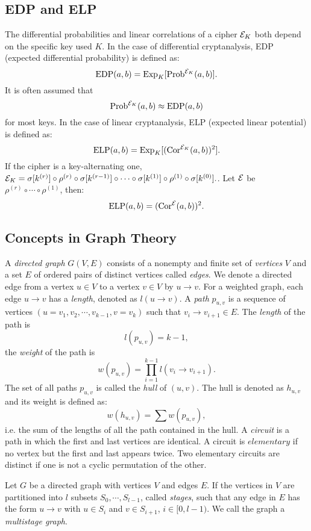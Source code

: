 \subsection{EDP and ELP}
The differential probabilities and linear correlations of a cipher $\mathcal{E}_K$ both depend on the specific key used $K$. In the case of differential cryptanalysis, EDP (expected differential probability) is defined as:
\[
    \text{EDP}(a,b)=\text{Exp}_{K}[\text{Prob}^{\mathcal{E}_K}(a,b)].
\]
It is often assumed that
\[
    \text{Prob}^{\mathcal{E}_K}(a,b)\approx\text{EDP}(a,b)
\]
for most keys. In the case of linear cryptanalysis, ELP (expected linear potential) is defined as:
\[
    \text{ELP}(a,b)=\text{Exp}_{K}[(\text{Cor}^{\mathcal{E}_K}(a,b))^2].
\]
If the cipher is a key-alternating one, $\mathcal{E}_K=\sigma[k^{(r)}]\circ\rho^{(r)}\circ\sigma[k^{(r-1)}]\circ\cdots\circ\sigma[k^{(1)}]\circ\rho^{(1)}\circ\sigma[k^{(0)}].$. Let $\mathcal{E}$ be $\rho^{(r)}\circ\cdots\circ\rho^{(1)}$, then:
\[
    \text{ELP}(a,b)=(\text{Cor}^{\mathcal{E}}(a,b))^2.
\]


\subsection{Concepts in Graph Theory}

A \textit{directed graph} $G(V, E)$ consists of a nonempty and finite set of \textit{vertices} $V$ and a set $E$ of ordered pairs of distinct vertices called \textit{edges}. We denote a directed edge from a vertex $u\in V$ to a vertex $v\in V$ by $u\rightarrow v$. For a weighted graph, each edge $u\rightarrow v$ has a \textit{length}, denoted as $l(u\rightarrow v)$. A \textit{path} $p_{u,v}$ is a sequence of vertices $(u=v_1,v_2,\cdots,v_{k-1},v=v_k)$ such that $v_i\rightarrow v_{i+1}\in E$. The \textit{length} of the path is
\[
    l(p_{u,v})=k-1,
\]
the \textit{weight} of the path is
\[
    w(p_{u,v})=\prod\limits_{i=1}^{k-1}l(v_i\rightarrow v_{i+1}).
\]
The set of all paths $p_{u,v}$ is called the \textit{hull} of $(u,v)$. The hull is denoted as $h_{u,v}$ and its weight is defined as:
\[
    w(h_{u,v})=\sum w(p_{u,v}),
\]
i.e. the sum of the lengths of all the path contained in the hull. A \textit{circuit} is a path in which the first and last vertices are identical. A circuit is $elementary$ if no vertex but the first and last appears twice. Two elementary circuits are distinct if one is not a cyclic permutation of the other. 

Let $G$ be a directed graph with vertices $V$ and edges $E$. If the vertices in $V$ are partitioned into $l$ subsets $S_0,\cdots,S_{l-1}$, called \textit{stages}, such that any edge in $E$ has the form $u\rightarrow v$ with $u\in S_i$ and $v\in S_{i+1}$, $i\in[0,l-1)$. We call the graph a \textit{multistage graph}.

